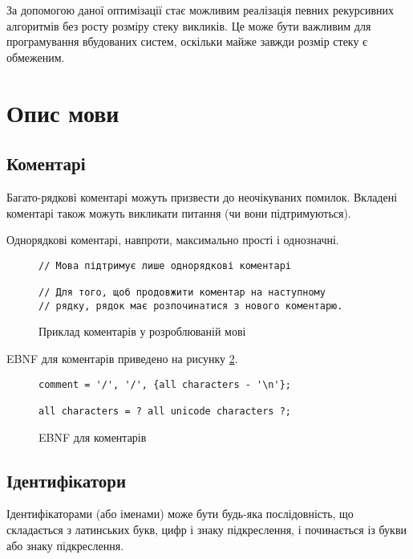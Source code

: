 \documentclass[main.tex]{subfiles}
\begin{document}
За допомогою даної оптимізації стає можливим реалізація певних рекурсивних алгоритмів без росту розміру стеку викликів.
Це може бути важливим для програмування вбудованих систем, оскільки майже завжди розмір стеку є обмеженим.

\section{Опис мови}\label{lang}
\newcommand{\deftype}[1]{\textbf{\code{#1}}}
\newcommand{\typeitem}[1]{\item \deftype{#1}.}

\FloatBarrier
\subsection{Коментарі}
Багато-рядкові коментарі можуть призвести до неочікуваних помилок.
Вкладені коментарі також можуть викликати питання (чи вони підтримуються).

Однорядкові коментарі, навпроти, максимально прості і однозначні.

\begin{figure}[h]
  \centering
  \begin{verbatim}
// Мова підтримує лише однорядкові коментарі

// Для того, щоб продовжити коментар на наступному
// рядку, рядок має розпочинатися з нового коментарю.
  \end{verbatim}
  \caption{Приклад коментарів у розроблюваній мові}
  \label{lang:comments}
\end{figure}

EBNF для коментарів приведено на рисунку \ref{ebnf:comment}.

\begin{figure}[h]
  \centering
  \begin{verbatim}
comment = '/', '/', {all characters - '\n'};

all characters = ? all unicode characters ?;
  \end{verbatim}
  \caption{EBNF для коментарів}
  \label{ebnf:comment}
\end{figure}

\FloatBarrier
\subsection{Ідентифікатори}
Ідентифікаторами (або іменами) може бути будь-яка послідовність, що складається з латинських букв, цифр і знаку підкреслення, і починається із букви або знаку підкреслення.
\end{document}
